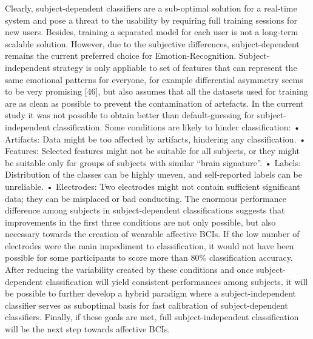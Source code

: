 Clearly, subject-dependent classifiers are a sub-optimal solution for a real-time system and pose a threat to the usability by requiring full training sessions for new users. Besides, training a separated model for each user is not a long-term scalable solution. However, due to the subjective differences, subject-dependent remains the current preferred choice for Emotion-Recognition. Subject-independent strategy is only appliable to set of features that can represent the same emotional patterns for everyone, for example differential asymmetry seems to be very promising [46], but also assumes that all the datasets used for training are as clean as possible to prevent the contamination of artefacts. In the current study it was not possible to obtain better than default-guessing for subject-independent classification. Some conditions are likely to hinder classification:
•	Artifacts: Data might be too affected by artifacts, hindering any classification.
•	Features: Selected features might not be suitable for all subjects, or they might be suitable only for groups of subjects with similar “brain signature”.
•	Labels: Distribution of the classes can be highly uneven, and self-reported labels can be unreliable.
•	Electrodes: Two electrodes might not contain sufficient significant data; they can be misplaced or bad conducting.
The enormous performance difference among subjects in subject-dependent classifications suggests that improvements in the first three conditions are not only possible, but also necessary towards the creation of wearable affective BCIs. If the low number of electrodes were the main impediment to classification, it would not have been possible for some participants to score more than 80\% classification accuracy. After reducing the variability created by these conditions and once subject-dependent classification will yield consistent performances among subjects, it will be possible to further develop a hybrid paradigm where a subject-independent classifier serves as suboptimal basis for fast calibration of subject-dependent classifiers. Finally, if these goals are met, full subject-independent classification will be the next step towards affective BCIs.
